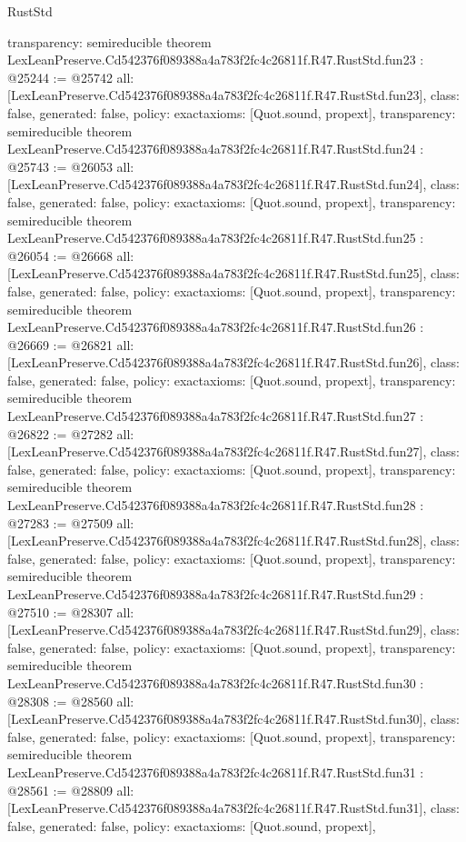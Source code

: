 \begin{lexlean}{RustStd}
\begin{coremodule}
{  transparency: semireducible
}
theorem LexLeanPreserve.Cd542376f089388a4a783f2fc4c26811f.R47.RustStd.fun23 : @25244 := @25742 {
  all: [LexLeanPreserve.Cd542376f089388a4a783f2fc4c26811f.R47.RustStd.fun23],
  class: false,
  generated: false,
  policy: exact{axioms: [Quot.sound, propext]},
  transparency: semireducible
}
theorem LexLeanPreserve.Cd542376f089388a4a783f2fc4c26811f.R47.RustStd.fun24 : @25743 := @26053 {
  all: [LexLeanPreserve.Cd542376f089388a4a783f2fc4c26811f.R47.RustStd.fun24],
  class: false,
  generated: false,
  policy: exact{axioms: [Quot.sound, propext]},
  transparency: semireducible
}
theorem LexLeanPreserve.Cd542376f089388a4a783f2fc4c26811f.R47.RustStd.fun25 : @26054 := @26668 {
  all: [LexLeanPreserve.Cd542376f089388a4a783f2fc4c26811f.R47.RustStd.fun25],
  class: false,
  generated: false,
  policy: exact{axioms: [Quot.sound, propext]},
  transparency: semireducible
}
theorem LexLeanPreserve.Cd542376f089388a4a783f2fc4c26811f.R47.RustStd.fun26 : @26669 := @26821 {
  all: [LexLeanPreserve.Cd542376f089388a4a783f2fc4c26811f.R47.RustStd.fun26],
  class: false,
  generated: false,
  policy: exact{axioms: [Quot.sound, propext]},
  transparency: semireducible
}
theorem LexLeanPreserve.Cd542376f089388a4a783f2fc4c26811f.R47.RustStd.fun27 : @26822 := @27282 {
  all: [LexLeanPreserve.Cd542376f089388a4a783f2fc4c26811f.R47.RustStd.fun27],
  class: false,
  generated: false,
  policy: exact{axioms: [Quot.sound, propext]},
  transparency: semireducible
}
theorem LexLeanPreserve.Cd542376f089388a4a783f2fc4c26811f.R47.RustStd.fun28 : @27283 := @27509 {
  all: [LexLeanPreserve.Cd542376f089388a4a783f2fc4c26811f.R47.RustStd.fun28],
  class: false,
  generated: false,
  policy: exact{axioms: [Quot.sound, propext]},
  transparency: semireducible
}
theorem LexLeanPreserve.Cd542376f089388a4a783f2fc4c26811f.R47.RustStd.fun29 : @27510 := @28307 {
  all: [LexLeanPreserve.Cd542376f089388a4a783f2fc4c26811f.R47.RustStd.fun29],
  class: false,
  generated: false,
  policy: exact{axioms: [Quot.sound, propext]},
  transparency: semireducible
}
theorem LexLeanPreserve.Cd542376f089388a4a783f2fc4c26811f.R47.RustStd.fun30 : @28308 := @28560 {
  all: [LexLeanPreserve.Cd542376f089388a4a783f2fc4c26811f.R47.RustStd.fun30],
  class: false,
  generated: false,
  policy: exact{axioms: [Quot.sound, propext]},
  transparency: semireducible
}
theorem LexLeanPreserve.Cd542376f089388a4a783f2fc4c26811f.R47.RustStd.fun31 : @28561 := @28809 {
  all: [LexLeanPreserve.Cd542376f089388a4a783f2fc4c26811f.R47.RustStd.fun31],
  class: false,
  generated: false,
  policy: exact{axioms: [Quot.sound, propext]},
}
\end{coremodule}
\end{lexlean}
